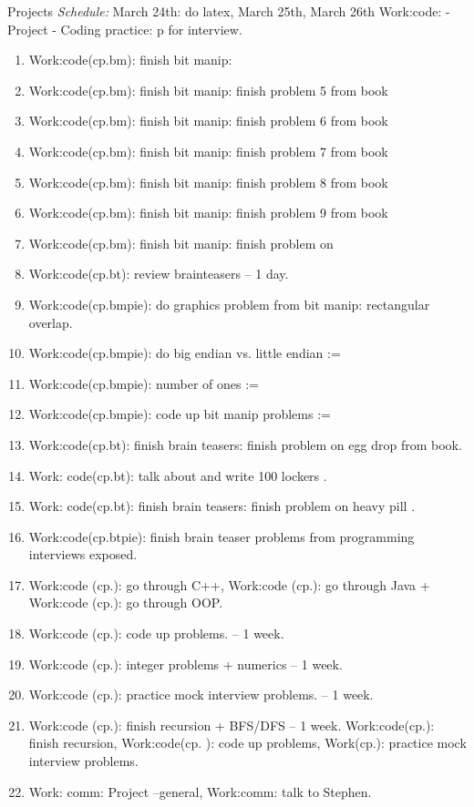 \documentclass[serif, mathserif, final]{beamer}
\begin{document}
\begin{frame}
\begin{columns}
\begin{block}{Projects}
\textit{Schedule:} March 24th: do latex, March 25th, March 26th
Work:code: - Project - Coding practice: p for interview. 
\begin{enumerate} 
\tiny \item \tiny Work:code(cp.bm): finish bit manip:  
\item \tiny Work:code(cp.bm): finish bit manip:  finish problem 5 from book 
\item \tiny Work:code(cp.bm): finish bit manip:  finish problem 6 from book 
\item \tiny Work:code(cp.bm): finish bit manip:  finish problem 7 from book
\item \tiny Work:code(cp.bm): finish bit manip:  finish problem 8 from book  
\item \tiny Work:code(cp.bm): finish bit manip:  finish problem 9 from book 
\item \tiny Work:code(cp.bm): finish bit manip:  finish problem on
\item \tiny Work:code(cp.bt): review brainteasers – 1 day. 
\item \tiny Work:code(cp.bmpie): do graphics problem from bit manip:
  rectangular overlap. 
\item \tiny Work:code(cp.bmpie): do big endian vs. little endian := 
\item \tiny Work:code(cp.bmpie): number of ones  := 
\item \tiny Work:code(cp.bmpie): code up bit manip problems :=  
\item \tiny Work:code(cp.bt): finish brain teasers:  finish problem on
  egg drop from book.  
\item\tiny Work: code(cp.bt): talk about and write 100 lockers . 
\item \tiny Work: code(cp.bt):  finish brain teasers: finish problem on heavy
pill . 
\item \tiny Work:code(cp.btpie): finish brain teaser problems from programming
interviews exposed. 
\item \tiny Work:code (cp.): go through C++, Work:code (cp.): go through Java +
Work:code (cp.): go through OOP. 
\item \tiny Work:code (cp.): code up problems.  – 1 week. 
\item \tiny Work:code (cp.): integer problems + numerics   -- 1 week. 
\item \tiny Work:code (cp.): practice mock interview problems. – 1 week.   
\item \tiny Work:code (cp.): finish recursion + BFS/DFS – 1 week. 
Work:code(cp.): finish recursion, Work:code(cp. ): code up problems,
Work(cp.): practice mock interview problems. 
\item \tiny Work: comm: Project –general,  Work:comm: talk to
  Stephen. 


\end{enumerate}
\end{block}
\end{columns}
\end{frame}
\end{document}

